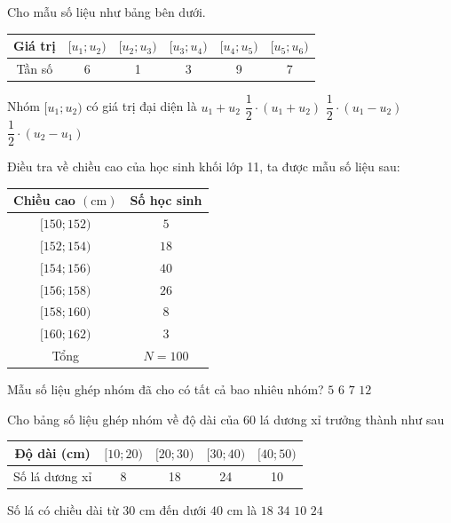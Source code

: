 \begin{ex}%
	Cho  mẫu số liệu như bảng bên dưới.
	\begin{center}
		\begin{tabular}{|c|c|c|c|c|c|}
			 \hline
			Giá  trị & $[u_1;u_2)$ & $[u_2;u_3)$ & $[u_3;u_4)$ & $[u_4;u_5)$ & $[u_5;u_6)$ \\
			 \hline
			Tần số & 6 & 1 & 3 &  9 & 7 \\
			\hline 
		\end{tabular}
	\end{center}
	Nhóm $[u_1;u_2)$ có giá trị đại diện  là
	 \choice
		 {$u_1+u_2$}
		 {\True $\dfrac{1}{2}\cdot(u_1+u_2)$}
		{$\dfrac{1}{2}\cdot(u_1-u_2)$} 
		{$\dfrac{1}{2}\cdot(u_2-u_1)$} 
	 \loigiai{
		 Giá trị đại diện của nhóm $[u_1;u_2)=\dfrac{1}{2}\cdot(u_1+u_2)$.
	} 
\end{ex}

\begin{ex}%
	Điều tra về chiều cao của học sinh khối lớp  11, ta được mẫu số liệu sau:
	\begin{center}
		\begin{tabular}{|c|c|}
			\hline Chiều cao $(\mathrm{cm})$ & Số học  sinh \\
			\hline$[150; 152)$ & $5$ \\ 
			 \hline$[152; 154)$ & $18$ \\
			\hline$[154;  156)$ & $40$ \\
			\hline$[156;  158)$ & $26$ \\
			\hline$[158; 160)$  & $8$ \\
			\hline$[160; 162)$ & $3$ \\ 
			\hline Tổng  & $N=100$ \\
			 \hline
		\end{tabular}
	\end{center}
	Mẫu số liệu  ghép nhóm đã cho có tất cả bao nhiêu nhóm?
	\choice 
		 {$5$}
		{\True $6$} 
		 {$7$}
		 {$12$}
\end{ex}

\begin{ex}%
	Cho bảng số liệu ghép nhóm  về độ dài của 60 lá dương xỉ trưởng thành như sau
	\begin{center}
		\begin{tabular}{|c|c|c|c|c|}
			\hline Độ dài (cm) & { $[10; 20)$ } & { $[20; 30)$ } & { $[30; 40)$ } & { $[40;  50)$ } \\
			\hline Số lá dương xỉ & 8 & 18 &  24 & 10 \\
			\hline 
		\end{tabular}
	\end{center}
	Số lá có  chiều dài từ $30$ cm đến dưới $40$ cm là
	 \choice
		{$18$} 
		{$34$} 
		{$10$} 
		{\True $24$} 
\end{ex}

